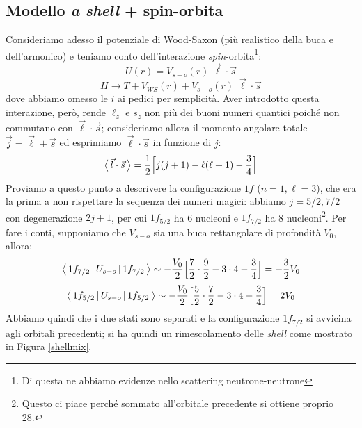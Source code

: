 \subsection{Modello \textit{a shell} + spin-orbita}
Consideriamo adesso il potenziale di Wood-Saxon (più realistico della buca e dell'armonico) e teniamo conto dell'interazione \textit{spin}-orbita\footnote{Di questa ne abbiamo evidenze nello scattering neutrone-neutrone}:
$$U (r) = V_{s-o}(r)\; \vec{\ell} \cdot \vec{s} $$
$$ H \to T+V_{WS}(r)+V_{s-o}(r)\;\vec{\ell} \cdot \vec{s}$$
dove abbiamo omesso le $i$ ai pedici per semplicità. Aver introdotto questa interazione, però, rende $\ell_z$ e $s_z$ non più dei buoni numeri quantici poiché non commutano con $\vec{\ell}\cdot\vec{s}$; consideriamo allora il momento angolare totale $\vec{j}= \vec{\ell} + \vec{s}$ ed esprimiamo $\vec{\ell}\cdot\vec{s}$ in funzione di $j$:
$$\bigl\langle\, \vec{l}\cdot\vec{s}\, \bigr\rangle = \frac{1}{2}\Bigl[j(j+1) - \ell(\ell+1) - \frac{3}{4} \Bigr]$$
Proviamo a questo punto a descrivere la configurazione $1f$ ($n=1,\ell=3$), che era la prima a non rispettare la sequenza dei numeri magici: abbiamo $j=5/2,7/2$ con degenerazione $2j+1$, per cui $1f_{5/2}$ ha 6 nucleoni e $1f_{7/2}$ ha 8 nucleoni\footnote{Questo ci piace perché sommato all'orbitale precedente si ottiene proprio 28.}. Per fare i conti, supponiamo che $V_{s-o}$ sia una buca rettangolare di profondità $V_0$, allora:
$$\bigl\langle\, 1f_{7/2}\, |\,U_{s-o}\, |\,1f_{7/2}\, \bigr\rangle \sim - \frac{V_0}{2}\Bigl[ \frac{7}{2}\cdot\frac{9}{2} - 3\cdot 4 - \frac{3}{4} \Bigr] = -\frac{3}{2} V_0$$
$$\bigl\langle\, 1f_{5/2}\, |\,U_{s-o}\, |\,1f_{5/2}\, \bigr\rangle \sim - \frac{V_0}{2}\Bigl[ \frac{5}{2}\cdot\frac{7}{2} - 3\cdot 4 - \frac{3}{4} \Bigr] = 2 V_0$$
Abbiamo quindi che i due stati sono separati e la configurazione $1f_{7/2}$ si avvicina agli orbitali precedenti; si ha quindi un rimescolamento delle \textit{shell} come mostrato in Figura \ref{shellmix}.
